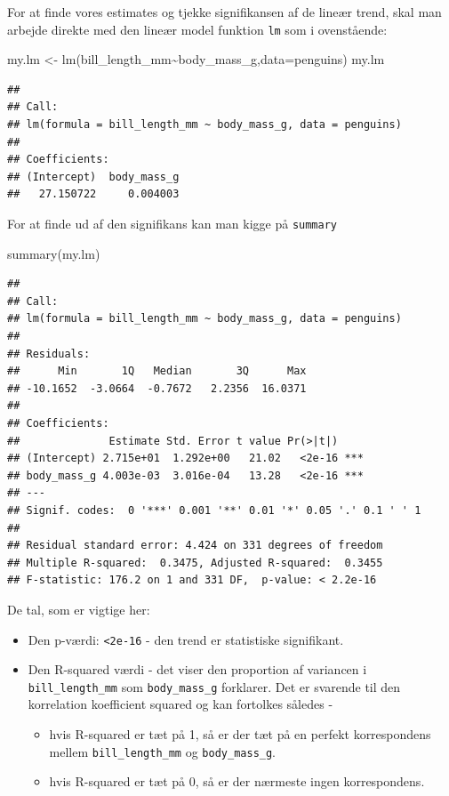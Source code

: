 \documentclass[
]{book}
\newenvironment{Shaded}{\begin{snugshade}}{\end{snugshade}}
\newcommand{\AttributeTok}[1]{\textcolor[rgb]{0.77,0.63,0.00}{#1}}
\newcommand{\FunctionTok}[1]{\textcolor[rgb]{0.00,0.00,0.00}{#1}}
\newcommand{\NormalTok}[1]{#1}
\newcommand{\OtherTok}[1]{\textcolor[rgb]{0.56,0.35,0.01}{#1}}
\newcommand{\SpecialCharTok}[1]{\textcolor[rgb]{0.00,0.00,0.00}{#1}}
\providecommand{\tightlist}{%
  \setlength{\itemsep}{0pt}\setlength{\parskip}{0pt}}
\begin{document}
For at finde vores estimates og tjekke signifikansen af de lineær trend, skal man arbejde direkte med den lineær model funktion \texttt{lm} som i ovenstående:

\begin{Shaded}
\begin{Highlighting}[]
\NormalTok{my.lm }\OtherTok{\textless{}{-}} \FunctionTok{lm}\NormalTok{(bill\_length\_mm}\SpecialCharTok{\textasciitilde{}}\NormalTok{body\_mass\_g,}\AttributeTok{data=}\NormalTok{penguins)}
\NormalTok{my.lm}
\end{Highlighting}
\end{Shaded}

\begin{verbatim}
## 
## Call:
## lm(formula = bill_length_mm ~ body_mass_g, data = penguins)
## 
## Coefficients:
## (Intercept)  body_mass_g  
##   27.150722     0.004003
\end{verbatim}

For at finde ud af den signifikans kan man kigge på \texttt{summary}

\begin{Shaded}
\begin{Highlighting}[]
\FunctionTok{summary}\NormalTok{(my.lm)}
\end{Highlighting}
\end{Shaded}

\begin{verbatim}
## 
## Call:
## lm(formula = bill_length_mm ~ body_mass_g, data = penguins)
## 
## Residuals:
##      Min       1Q   Median       3Q      Max 
## -10.1652  -3.0664  -0.7672   2.2356  16.0371 
## 
## Coefficients:
##              Estimate Std. Error t value Pr(>|t|)    
## (Intercept) 2.715e+01  1.292e+00   21.02   <2e-16 ***
## body_mass_g 4.003e-03  3.016e-04   13.28   <2e-16 ***
## ---
## Signif. codes:  0 '***' 0.001 '**' 0.01 '*' 0.05 '.' 0.1 ' ' 1
## 
## Residual standard error: 4.424 on 331 degrees of freedom
## Multiple R-squared:  0.3475, Adjusted R-squared:  0.3455 
## F-statistic: 176.2 on 1 and 331 DF,  p-value: < 2.2e-16
\end{verbatim}

De tal, som er vigtige her:

\begin{itemize}
\tightlist
\item
  Den p-værdi: \texttt{\textless{}2e-16} - den trend er statistiske signifikant.
\item
  Den R-squared værdi - det viser den proportion af variancen i \texttt{bill\_length\_mm} som \texttt{body\_mass\_g} forklarer. Det er svarende til den korrelation koefficient squared og kan fortolkes således -

  \begin{itemize}
  \tightlist
  \item
    hvis R-squared er tæt på 1, så er der tæt på en perfekt korrespondens mellem \texttt{bill\_length\_mm} og \texttt{body\_mass\_g}.
  \item
    hvis R-squared er tæt på 0, så er der nærmeste ingen korrespondens.
  \end{itemize}
\end{itemize}
\end{document}

